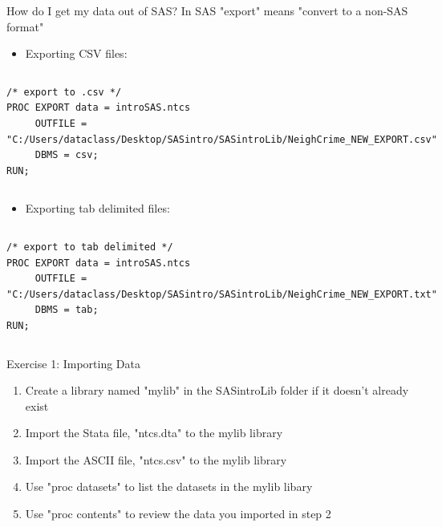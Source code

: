 \documentclass[table,smaller]{beamer}
\begin{document}
\begin{frame}[fragile,label=sec-2-5]{How do I get my data out of SAS?}
 In SAS "export" means "convert to a non-SAS format"

\begin{itemize}
\item Exporting CSV files:
\end{itemize}
\vspace{-.75em} \begin{columns}  \begin{block}{}
\begin{verbatim}
/* export to .csv */
PROC EXPORT data = introSAS.ntcs
     OUTFILE = "C:/Users/dataclass/Desktop/SASintro/SASintroLib/NeighCrime_NEW_EXPORT.csv"
     DBMS = csv;
RUN;
\end{verbatim}
\end{block} \end{columns} \vspace{.25em}

\begin{itemize}
\item Exporting tab delimited files:
\end{itemize}
\vspace{-.75em} \begin{columns}  \begin{block}{}
\begin{verbatim}
/* export to tab delimited */
PROC EXPORT data = introSAS.ntcs
     OUTFILE = "C:/Users/dataclass/Desktop/SASintro/SASintroLib/NeighCrime_NEW_EXPORT.txt"
     DBMS = tab;
RUN;
\end{verbatim}
\end{block} \end{columns} \vspace{.25em}
\end{frame}

\begin{frame}[label=sec-2-6]{Exercise 1: Importing Data}
\begin{enumerate}
\item Create a library named "mylib" in the SASintroLib folder if it doesn't already exist
\item Import the Stata file, "ntcs.dta" to the mylib library
\item Import the ASCII file, "ntcs.csv" to the mylib library
\item Use "proc datasets" to list the datasets in the mylib libary
\item Use "proc contents" to review the data you imported in step 2
\end{enumerate}
\end{frame}
\end{document}
